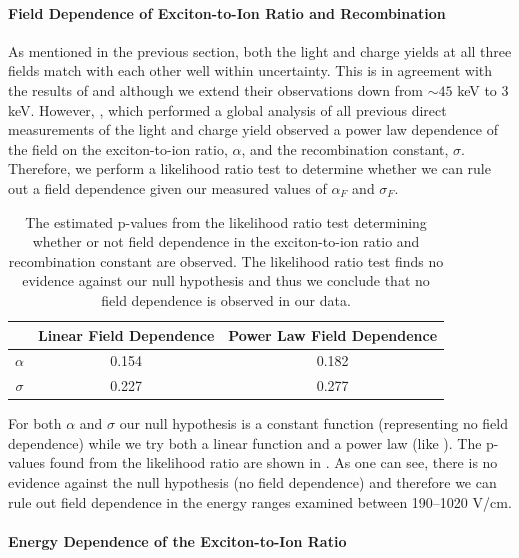 \paragraph{Field Dependence of Exciton-to-Ion Ratio and Recombination}

As mentioned in the previous section, both the light and charge yields at all three fields match with each other well within uncertainty.  This is in agreement with the results of  and  although we extend their observations down from $\sim 45$ keV to 3 keV.  However, , which performed a global analysis of all previous direct measurements of the light and charge yield observed a power law dependence of the field on the exciton-to-ion ratio, $\alpha$, and the recombination constant, $\sigma$.  Therefore, we perform a likelihood ratio test to determine whether we can rule out a field dependence given our measured values of $\alpha_F$ and $\sigma_F$.


\begin{table}[t]
\centering
\def\arraystretch{1.22}
\begin{tabular}{c|cc}
 & Linear Field Dependence & Power Law Field Dependence \\
\hline
$\alpha$ & 0.154 & 0.182 \\
$\sigma$ & 0.227 & 0.277 \\
\end{tabular}
\caption{The estimated p-values from the likelihood ratio test determining whether or not field dependence in the exciton-to-ion ratio and recombination constant are observed.  The likelihood ratio test finds no evidence against our null hypothesis and thus we conclude that no field dependence is observed in our data.}
\label{tab:nerix_field_dependence}
\end{table}


For both $\alpha$ and $\sigma$ our null hypothesis is a constant function (representing no field dependence) while we try both a linear function and a power law (like ).  The p-values found from the likelihood ratio are shown in .  As one can see, there is no evidence against the null hypothesis (no field dependence) and therefore we can rule out field dependence in the energy ranges examined between 190--1020 V/cm.


\paragraph{Energy Dependence of the Exciton-to-Ion Ratio}

